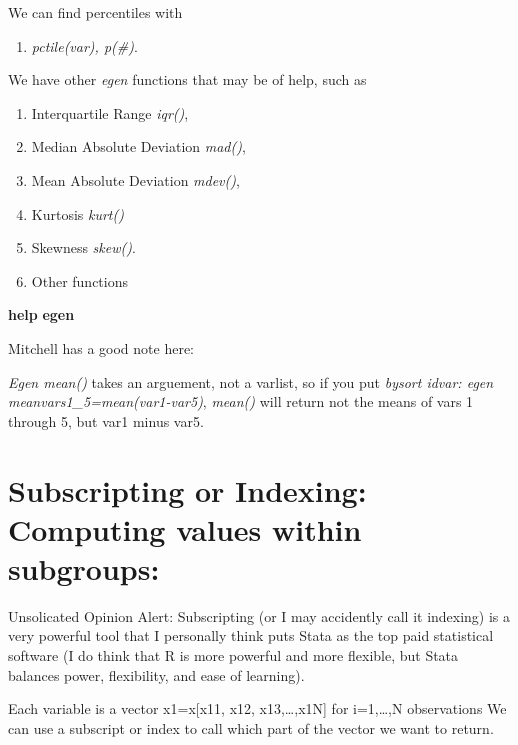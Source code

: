 \documentclass[
]{book}
\newenvironment{Shaded}{\begin{snugshade}}{\end{snugshade}}
\newcommand{\KeywordTok}[1]{\textcolor[rgb]{0.13,0.29,0.53}{\textbf{#1}}}
\providecommand{\tightlist}{%
  \setlength{\itemsep}{0pt}\setlength{\parskip}{0pt}}
\begin{document}
We can find percentiles with

\begin{enumerate}
\def\labelenumi{\arabic{enumi}.}
\tightlist
\item
  \emph{pctile(var), p(\#)}.
\end{enumerate}

We have other \emph{egen} functions that may be of help, such as

\begin{enumerate}
\def\labelenumi{\arabic{enumi}.}
\tightlist
\item
  Interquartile Range \emph{iqr()},
\item
  Median Absolute Deviation \emph{mad()},
\item
  Mean Absolute Deviation \emph{mdev()},
\item
  Kurtosis \emph{kurt()}
\item
  Skewness \emph{skew()}.
\item
  Other functions
\end{enumerate}

\begin{Shaded}
\begin{Highlighting}[]
\KeywordTok{help} \KeywordTok{egen}
\end{Highlighting}
\end{Shaded}

Mitchell has a good note here:

\emph{Egen mean()} takes an arguement, not a varlist, so if you put
\emph{bysort idvar: egen meanvars1\_5=mean(var1-var5)}, \emph{mean()} will return not the
means of vars 1 through 5, but var1 minus var5.

\section{Subscripting or Indexing: Computing values within subgroups:}\label{subscripting-or-indexing-computing-values-within-subgroups}

Unsolicated Opinion Alert:
Subscripting (or I may accidently call it indexing) is a very powerful tool
that I personally think puts Stata as the top paid statistical software
(I do think that R is more powerful and more flexible, but Stata balances
power, flexibility, and ease of learning).

Each variable is a vector x1=x{[}x11, x12, x13,\ldots,x1N{]} for i=1,\ldots,N observations
We can use a subscript or index to call which part of the vector we want to
return.
\end{document}
